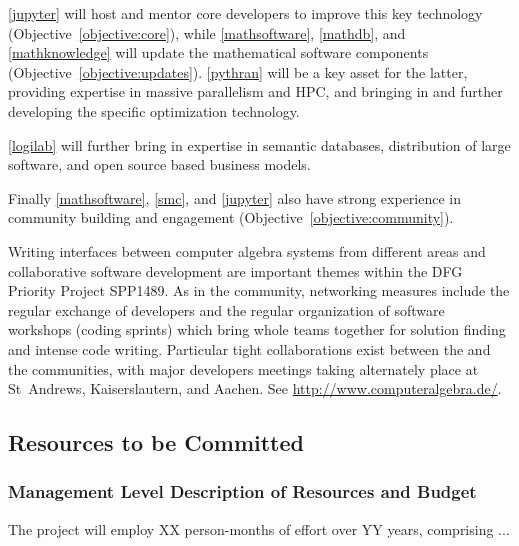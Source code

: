 \documentclass[noworkareas,deliverables,keys]{euproposal}                  %
\begin{document}
\begin{proposal}
\ref{jupyter} will host and mentor core \Jupyter developers to improve
this key technology (Objective~\ref{objective:core}), while
\ref{mathsoftware}, \ref{mathdb}, and \ref{mathknowledge} will update
the mathematical software components
(Objective~\ref{objective:updates}). \ref{pythran} will be a key asset
for the latter, providing expertise in massive parallelism and HPC,
and bringing in and further developing the specific \Pythran
optimization technology.

\ref{logilab} will further bring in expertise in semantic databases,
distribution of large software, and open source based business models.


Finally \ref{mathsoftware}, \ref{smc}, and \ref{jupyter} also have
strong experience in community building and engagement
(Objective~\ref{objective:community}).

Writing interfaces between computer algebra systems from different areas and collaborative 
software development are important themes within the DFG Priority Project SPP1489.
As in the {} community, networking measures include the regular exchange 
of developers and the regular organization of software workshops (coding sprints) which 
bring whole teams together for solution finding and intense code writing. Particular tight 
collaborations exist between the {} and the {} communities, with 
major {} developers meetings taking alternately place at St~Andrews,
Kaiserslautern, and Aachen. See \url{http://www.computeralgebra.de/}.


\draftpage

\subsection{Resources to be Committed}



\subsubsection*{Management Level Description of Resources and Budget}


The project will employ XX person-months of effort over YY years,
comprising ...



\end{proposal}
\end{document}

